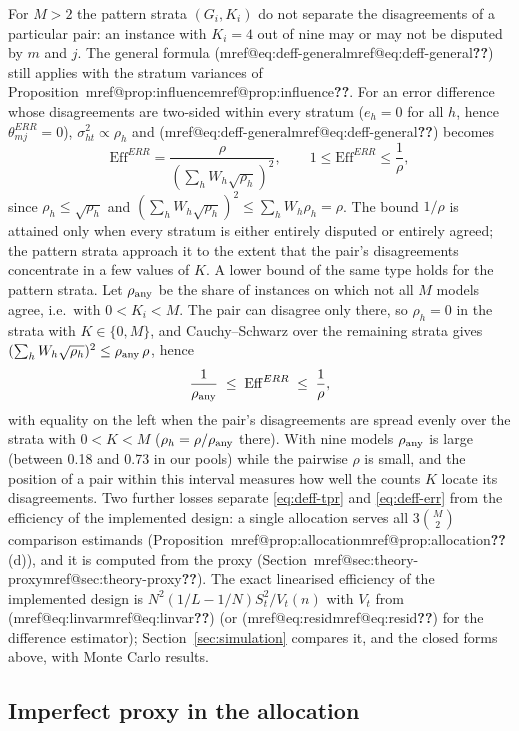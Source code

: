 \documentclass[pdflatex,sn-mathphys-num,iicol]{sn-jnl}
\makeatletter
\theoremstyle{thmstyleone}
\theoremstyle{thmstyletwo}
\theoremstyle{thmstylethree}
\newcommand{\Mref}[1]{\ifcsname mref@#1\endcsname\csname mref@#1\endcsname\else\textbf{??}\fi}
\makeatother
\begin{document}
For $M>2$ the pattern strata $(G_i,K_i)$ do not separate the disagreements of a particular pair:
an instance with $K_i=4$ out of nine may or may not be disputed by $m$ and $j$. The general
formula (\Mref{eq:deff-general}) still applies with the stratum variances of
Proposition~\Mref{prop:influence}. For an error difference whose disagreements are two-sided within
every stratum ($e_h=0$ for all $h$, hence $\theta^{ERR}_{mj}=0$), $\sigma^2_{ht}\propto\rho_h$
and (\Mref{eq:deff-general}) becomes
\begin{equation}\label{eq:deff-mixed}
\mathrm{Eff}^{ERR}=\frac{\rho}{(\sum_hW_h\sqrt{\rho_h})^2},\qquad 1\le\mathrm{Eff}^{ERR}\le\frac1\rho,
\end{equation}
since $\rho_h\le\sqrt{\rho_h}$ and $(\sum_hW_h\sqrt{\rho_h})^2\le\sum_hW_h\rho_h=\rho$. The bound $1/\rho$ is
attained only when every stratum is either entirely disputed or entirely agreed; the pattern
strata approach it to the extent that the pair's disagreements concentrate in a few values of
$K$. A lower bound of the same type holds for the pattern strata. Let $\rho_{\rm any}$ be the share
of instances on which not all $M$ models agree, i.e.\ with $0<K_i<M$. The pair can disagree only
there, so $\rho_h=0$ in the strata with $K\in\{0,M\}$, and Cauchy--Schwarz over the remaining strata
gives $(\sum_hW_h\sqrt{\rho_h})^2\le\rho_{\rm any}\,\rho$, hence
\begin{equation}\label{eq:deff-sandwich}
\frac{1}{\rho_{\rm any}}\;\le\;\mathrm{Eff}^{ERR}\;\le\;\frac{1}{\rho},
\end{equation}
with equality on the left when the pair's disagreements are spread evenly over the strata with
$0<K<M$ ($\rho_h=\rho/\rho_{\rm any}$ there). With nine models $\rho_{\rm any}$ is large (between
0.18 and 0.73 in our pools) while the pairwise $\rho$ is small, and the position of a pair within
this interval measures how well the counts $K$ locate its disagreements. Two further losses separate \eqref{eq:deff-tpr} and \eqref{eq:deff-err} from the efficiency of the implemented
design: a single allocation serves all $3\binom M2$ comparison estimands
(Proposition~\Mref{prop:allocation}(d)), and it is computed from the proxy
(Section~\Mref{sec:theory-proxy}). The exact linearised efficiency of the implemented design is
$N^2(1/L-1/N)S^2_t/V_t(n)$ with $V_t$ from (\Mref{eq:linvar}) (or (\Mref{eq:resid}) for the difference estimator); Section~\ref{sec:simulation}
compares it, and the closed forms above, with Monte Carlo results.

\subsection{Imperfect proxy in the allocation}\label{si:theory-proxy}
\end{document}
